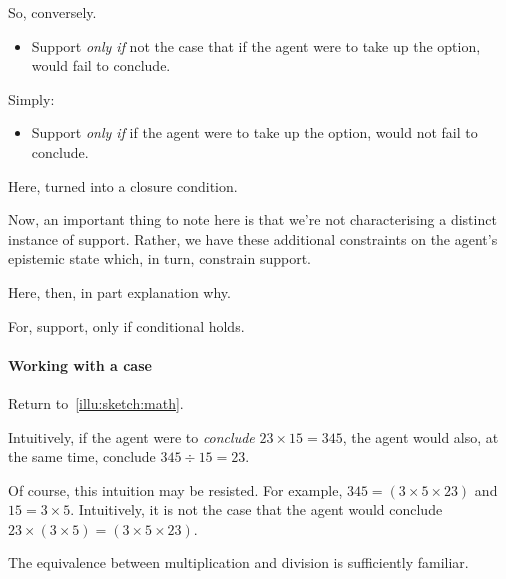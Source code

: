\begin{note}
  So, conversely.

  \begin{itemize}
  \item
    Support \emph{only if} not the case that if the agent were to take up the option, would fail to conclude.
  \end{itemize}

  Simply:

  \begin{itemize}
  \item
    Support \emph{only if} if the agent were to take up the option, would not fail to conclude.
  \end{itemize}

  Here, turned into a closure condition.
\end{note}

\begin{note}
  \color{red}

  Now, an important thing to note here is that we're not characterising a distinct instance of support.
  Rather, we have these additional constraints on the agent's epistemic state which, in turn, constrain support.

  Here, then, in part explanation why.

  For, support, only if conditional holds.
\end{note}

\paragraph*{Working with a case}

\begin{note}
  Return to~\autoref{illu:sketch:math}.

  \begin{quote}
    \scenarioClacMulDiv*
  \end{quote}

  Intuitively, if the agent were to \emph{conclude} \(23 \times 15 = 345\), the agent would also, at the same time, conclude \(345 \div 15 = 23\).

  Of course, this intuition may be resisted.
  For example, \(345 = (3 \times 5 \times 23)\) and \(15 = 3 \times 5\).
  Intuitively, it is not the case that the agent would conclude \(23 \times (3 \times 5) = (3 \times 5 \times 23)\).

  The equivalence between multiplication and division is sufficiently familiar.
\end{note}

